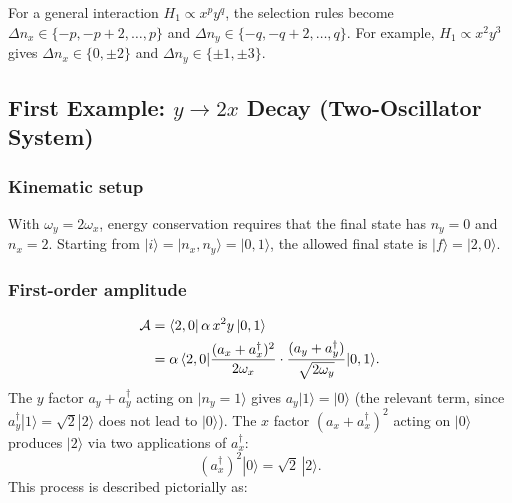 
\begin{remark}[Generalisation]
For a general interaction $H_1 \propto x^p y^q$, the selection rules become $\Delta n_x \in \{-p, -p+2, \ldots, p\}$ and $\Delta n_y \in \{-q, -q+2, \ldots, q\}$.  For example, $H_1 \propto x^2 y^3$ gives $\Delta n_x \in \{0, \pm 2\}$ and $\Delta n_y \in \{\pm 1, \pm 3\}$.
\end{remark}

\subsection*{First Example: $y \to 2x$ Decay (Two-Oscillator System)}

\subsubsection*{Kinematic setup}
With $\omega_y = 2\omega_x$, energy conservation requires that the final state has $n_y = 0$ and $n_x = 2$.  Starting from $|i\rangle = |n_x, n_y\rangle = |0,1\rangle$, the allowed final state is $|f\rangle = |2,0\rangle$.

\subsubsection*{First-order amplitude}
\begin{align}
  \mathcal{A}
  &= \langle 2,0 | \,\alpha\, x^2 y\, | 0,1 \rangle \notag\\
  &= \alpha\,\langle 2,0 |
      \frac{(a_x + a_x^\dagger)^2}{2\omega_x}
      \cdot
      \frac{(a_y + a_y^\dagger)}{\sqrt{2\omega_y}}
    | 0,1 \rangle.
  \label{eq:lec04:amp-2osc}
\end{align}
The $y$ factor $a_y + a_y^\dagger$ acting on $|n_y = 1\rangle$ gives $a_y|1\rangle = |0\rangle$ (the relevant term, since $a_y^\dagger|1\rangle = \sqrt{2}|2\rangle$ does not lead to $|0\rangle$).  The $x$ factor $(a_x + a_x^\dagger)^2$ acting on $|0\rangle$ produces $|2\rangle$ via two applications of $a_x^\dagger$:
\begin{equation}
  (a_x^\dagger)^2 |0\rangle = \sqrt{2}\,|2\rangle.
  \label{eq:lec04:x-create-two}
\end{equation}
This process is described pictorially as:

